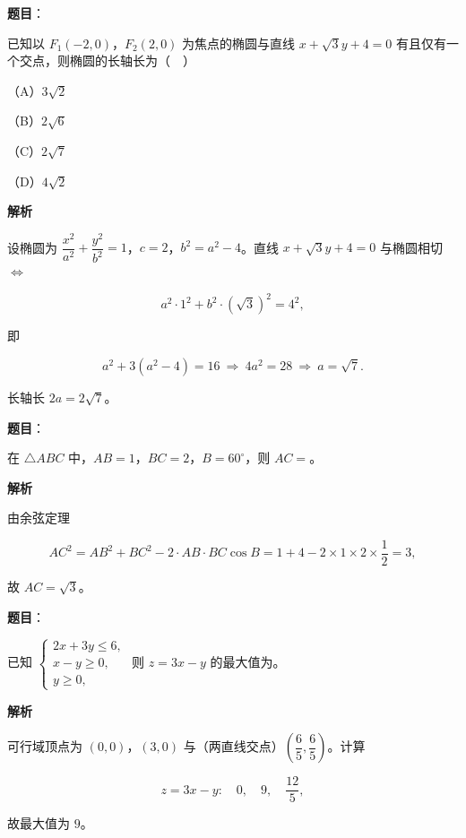 \begin{answer}

\textbf{题目}：

已知以 $F_1(-2,0)$，$F_2(2,0)$ 为焦点的椭圆与直线 $x+\sqrt3y+4=0$ 有且仅有一个交点，则椭圆的长轴长为（　）

（A）$3\sqrt2$

（B）$2\sqrt6$

（C）$2\sqrt7$

（D）$4\sqrt2$

\textbf{解析}

设椭圆为 $\dfrac{x^2}{a^2}+\dfrac{y^2}{b^2}=1$，$c=2$，$b^2=a^2-4$。直线 $x+\sqrt3y+4=0$ 与椭圆相切 $\Leftrightarrow$

\nopagebreak[4]
\[a^2\cdot1^2+b^2\cdot(\sqrt3)^2=4^2,\]

即

\nopagebreak[4]
\[a^2+3(a^2-4)=16\ \Rightarrow\ 4a^2=28\ \Rightarrow\ a=\sqrt7.\]

长轴长 $2a=2\sqrt7$。


\end{answer}
\begin{answer}

\textbf{题目}：

在 $\triangle ABC$ 中，$AB=1$，$BC=2$，$B=60^\circ$，则 $AC=$\gkblank{}。

\textbf{解析}

由余弦定理

\nopagebreak[4]
\[AC^2=AB^2+BC^2-2\cdot AB\cdot BC\cos B=1+4-2\times1\times2\times\frac12=3,\]

故 $AC=\sqrt3$。


\end{answer}
\begin{answer}

\textbf{题目}：

已知 $\begin{cases}2x+3y\leqslant6,\\ x-y\geqslant0,\\ y\geqslant0,\end{cases}$ 则 $z=3x-y$ 的最大值为\gkblank{}。

\textbf{解析}

可行域顶点为 $(0,0)$，$(3,0)$ 与（两直线交点）$\left(\dfrac65,\dfrac65\right)$。计算

\nopagebreak[4]
\[z=3x-y:\quad 0,\quad 9,\quad \frac{12}5,\]

故最大值为 $9$。


\end{answer}
